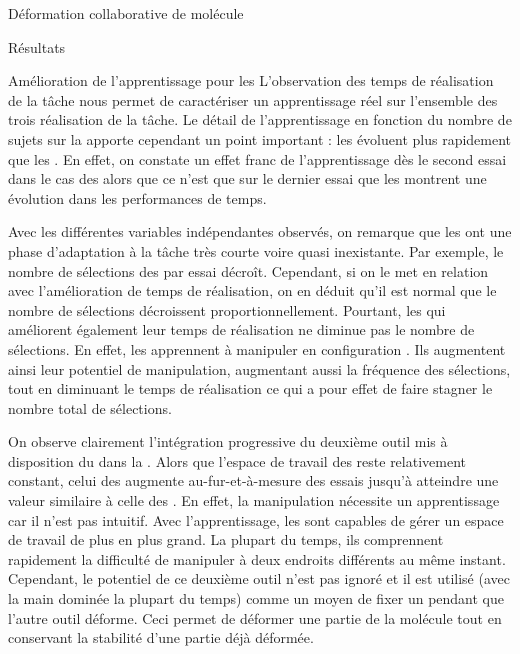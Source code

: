 \documentclass[myfrancais]{mythesis}
\begin{document}
\begin{mychapter}{Déformation collaborative de molécule}
\begin{mysection}{Résultats}
\begin{mysubsection}{Amélioration de l'apprentissage pour les }
				L'observation des temps de réalisation de la tâche  nous permet de caractériser un apprentissage réel sur l'ensemble des trois réalisation de la tâche.
				Le détail de l'apprentissage en fonction du nombre de sujets sur la  apporte cependant un point important : les  évoluent plus rapidement que les .
				En effet, on constate un effet franc de l'apprentissage dès le second essai dans le cas des  alors que ce n'est que sur le dernier essai que les  montrent une évolution dans les performances de temps.

				Avec les différentes variables indépendantes observés, on remarque que les  ont une phase d'adaptation à la tâche très courte voire quasi inexistante.
				Par exemple, le nombre de sélections des  par essai décroît.
				Cependant, si on le met en relation avec l'amélioration de temps de réalisation, on en déduit qu'il est normal que le nombre de sélections décroissent proportionnellement.
				Pourtant, les  qui améliorent également leur temps de réalisation ne diminue pas le nombre de sélections.
				En effet, les  apprennent à manipuler en configuration .
				Ils augmentent ainsi leur potentiel de manipulation, augmentant aussi la fréquence des sélections, tout en diminuant le temps de réalisation ce qui a pour effet de faire stagner le nombre total de sélections.

				On observe clairement l'intégration progressive du deuxième outil mis à disposition du  dans la .
				Alors que l'espace de travail des  reste relativement constant, celui des  augmente au-fur-et-à-mesure des essais jusqu'à atteindre une valeur similaire à celle des .
				En effet, la manipulation  nécessite un apprentissage car il n'est pas intuitif.
				Avec l'apprentissage, les  sont capables de gérer un espace de travail de plus en plus grand.
				La plupart du temps, ils comprennent rapidement la difficulté de manipuler à deux endroits différents au même instant.
				Cependant, le potentiel de ce deuxième outil n'est pas ignoré et il est utilisé (avec la main dominée la plupart du temps) comme un moyen de fixer un  pendant que l'autre outil déforme.
				Ceci permet de déformer une partie de la molécule tout en conservant la stabilité d'une partie déjà déformée.


\end{mysubsection}
\end{mysection}
\end{mychapter}
\end{document}
